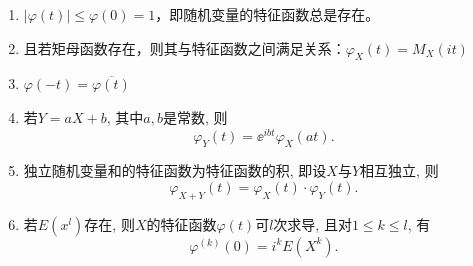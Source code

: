 \begin{proposition}[特征函数的性质]
    \begin{enumerate}
        \item$\lvert \varphi(t) \rvert \leq \varphi(0) = 1$，即随机变量的特征函数总是存在。
        \item 且若矩母函数存在，则其与特征函数之间满足关系：$\varphi_X(t) = M_X(it)$
              \item$\varphi(-t) = \overline{\varphi(t)}$
        \item 若$Y = aX + b$, 其中$a,b$是常数, 则
              \begin{equation}\label{eq:chf_linear}
                  \varphi_Y(t) = \ee^{ibt} \varphi_X(at).
              \end{equation}
        \item 独立随机变量和的特征函数为特征函数的积,
              即设$X$与$Y$相互独立, 则
              \begin{equation}\label{eq:chf_sum}
                  \varphi_{X+Y}(t) = \varphi_X(t) \cdot \varphi_Y(t).
              \end{equation}
        \item 若$E(x^l)$存在,
              则$X$的特征函数$\varphi(t)$可$l$次求导,
              且对$1 \leq k \leq l$, 有
              \begin{equation}\label{eq:chf_derivative}
                  \varphi^{(k)}(0) = i^k E(X^k).
              \end{equation}
    \end{enumerate}
\end{proposition}

